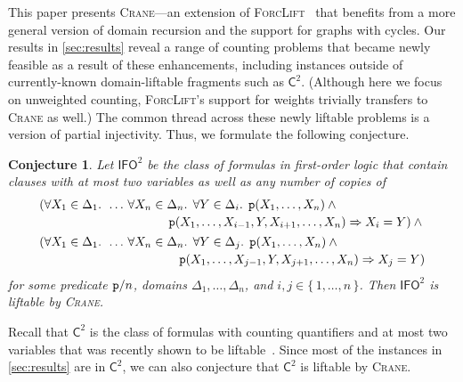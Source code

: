 \documentclass{article}
\newtheorem{conjecture}{Conjecture}
\theoremstyle{definition}
\theoremstyle{remark}
\newcommand{\Ctwo}{$\mathsf{C}^{2}$}
\newcommand{\IFO}{$\mathsf{I}\mathsf{FO}^{2}$}
\begin{document}
This paper presents \textsc{Crane}---an extension of
\textsc{ForcLift}~\cite{DBLP:conf/ijcai/BroeckTMDR11} that benefits from a more
general version of domain recursion and the support for graphs with cycles. Our
results in \cref{sec:results} reveal a range of counting problems that became
newly feasible as a result of these enhancements, including instances outside of
currently-known domain-liftable fragments such as \Ctwo{}. (Although here we
focus on unweighted counting, \textsc{ForcLift}'s support for weights trivially
transfers to \textsc{Crane} as well.) The common thread across these newly
liftable problems is a version of partial injectivity. Thus, we formulate the
following conjecture.
\begin{conjecture}
  Let \IFO{} be the class of formulas in first-order logic that contain clauses
  with at most two variables as well as any number of copies of
  \begin{align*}
    &\begin{multlined}[t][0.9\linewidth]
      (\forall X_{1} \in \Delta_{1}\text{. }\dots\,\forall X_{n} \in \Delta_{n}\text{. }\forall Y \in \Delta_{i}\text{. }\texttt{\textup{p}}(X_{1}, \dots, X_{n}) \land{}\\
      \texttt{\textup{p}}(X_{1}, \dots, X_{i-1}, Y, X_{i+1}, \dots, X_{n}) \Rightarrow X_{i} = Y) \land{}
    \end{multlined}\\
    &\begin{multlined}[t][0.9\linewidth]
      (\forall X_{1} \in \Delta_{1}\text{. }\dots\,\forall X_{n} \in \Delta_{n}\text{. }\forall Y \in \Delta_{j}\text{. }\texttt{\textup{p}}(X_{1}, \dots, X_{n}) \land{}\\
      \texttt{\textup{p}}(X_{1}, \dots, X_{j-1}, Y, X_{j+1}, \dots, X_{n}) \Rightarrow X_{j} = Y)
    \end{multlined}
  \end{align*}
  for some predicate $\texttt{\textup{p}}/n$, domains
  $\Delta_{1}, \dots, \Delta_{n}$, and $i, j \in \{\, 1, \dots, n \,\}$. Then
  \IFO{} is liftable by \textsc{Crane}.
\end{conjecture}
Recall that \Ctwo{} is the class of formulas with counting quantifiers and at
most two variables that was recently shown to be
liftable~\cite{DBLP:journals/jair/Kuzelka21}. Since most of the instances in
\cref{sec:results} are in \Ctwo{}, we can also conjecture that \Ctwo{} is
liftable by \textsc{Crane}.
\end{document}
